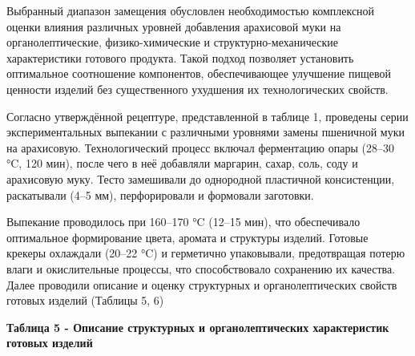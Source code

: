 {{{Выбранный диапазон замещения обусловлен необходимостью комплексной
оценки влияния различных уровней добавления арахисовой муки на
органолептические, физико-химические и структурно-механические
характеристики готового продукта. Такой подход позволяет установить
оптимальное соотношение компонентов, обеспечивающее улучшение пищевой
ценности изделий без существенного ухудшения их технологических свойств.

Согласно утверждённой рецептуре, представленной в таблице 1, проведены
серии экспериментальных выпекании с различными уровнями замены пшеничной
муки на арахисовую. Технологический процесс включал ферментацию опары
(28--30 °C, 120 мин), после чего в неё добавляли маргарин, сахар, соль,
соду и арахисовую муку. Тесто замешивали до однородной пластичной
консистенции, раскатывали (4--5 мм), перфорировали и формовали
заготовки.

Выпекание проводилось при 160--170 °C (12--15 мин), что обеспечивало
оптимальное формирование цвета, аромата и структуры изделий. Готовые
крекеры охлаждали (20--22 °C) и герметично упаковывали, предотвращая
потерю влаги и окислительные процессы, что способствовало сохранению их
качества. Далее проводили описание и оценку структурных и
органолептических свойств готовых изделий (Таблицы 5, 6)

{\bfseries Таблица 5 - Описание структурных и органолептических
характеристик готовых изделий}

}}}
